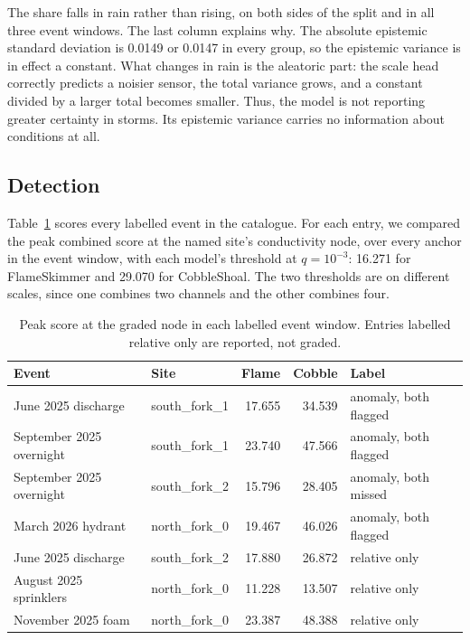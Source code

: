 \documentclass{article}
\begin{document}
The share falls in rain rather than rising, on both sides of the split and in
all three event windows. The last column explains why. The absolute epistemic
standard deviation is 0.0149 or 0.0147 in every group, so the epistemic
variance is in effect a constant. What changes in rain is the aleatoric part:
the scale head correctly predicts a noisier sensor, the total variance grows,
and a constant divided by a larger total becomes smaller. Thus, the model is
not reporting greater certainty in storms. Its epistemic variance carries no
information about conditions at all.

\subsection{Detection}
\label{sec:detectionresults}

Table~\ref{tab:events} scores every labelled event in the catalogue. For each
entry, we compared the peak combined score at the named site's conductivity
node, over every anchor in the event window, with each model's threshold at
$q = 10^{-3}$: 16.271 for FlameSkimmer and 29.070 for CobbleShoal. The two
thresholds are on different scales, since one combines two channels and the
other combines four.

\begin{table}[t]
  \centering
  \caption{Peak score at the graded node in each labelled event window. Entries
    labelled relative only are reported, not graded.}
  \label{tab:events}
  \begin{tabular}{llrrl}
    \toprule
    Event & Site & Flame & Cobble & Label \\
    \midrule
    June 2025 discharge         & south\_fork\_1 & 17.655 & 34.539 & anomaly, both flagged \\
    September 2025 overnight    & south\_fork\_1 & 23.740 & 47.566 & anomaly, both flagged \\
    September 2025 overnight    & south\_fork\_2 & 15.796 & 28.405 & anomaly, both missed \\
    March 2026 hydrant          & north\_fork\_0 & 19.467 & 46.026 & anomaly, both flagged \\
    \midrule
    June 2025 discharge         & south\_fork\_2 & 17.880 & 26.872 & relative only \\
    August 2025 sprinklers      & north\_fork\_0 & 11.228 & 13.507 & relative only \\
    November 2025 foam          & north\_fork\_0 & 23.387 & 48.388 & relative only \\
    \bottomrule
  \end{tabular}
\end{table}
\end{document}
